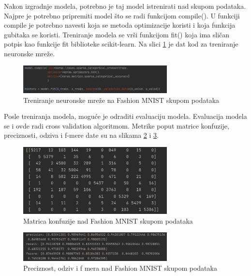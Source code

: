 \documentclass[a4paper,12pt]{report}
\begin{document}
Nakon izgradnje modela, potrebno je taj model istrenirati nad skupom podataka. Najpre je potrebno pripremiti model što se radi funkcijom compile(). U funkciji compile je potrebno navesti koja se metoda optimizacije koristi i koja funkcija gubitaka se koristi. Treniranje modela se vrši funkcijom fit() koja ima sličan potpis kao funkcije fit biblioteke scikit-learn. Na slici \ref{fig:model_compile_fit_NN} je dat kod za treniranje neuronske mreže. 

\begin{figure}[h]
    \centering
    \includegraphics[width=0.7\textwidth]{model_compile_fit_NN.png}
    \caption{Treniranje neuronske mreže na Fashion MNIST skupom podataka}\label{fig:model_compile_fit_NN}
\end{figure}


Posle treniranja modela, moguće je odraditi evaluaciju modela. Evaluacija modela se i ovde radi cross validation algoritmom. Metrike poput matrice konfuzije, preciznosti, odziva i f-mere date su na slikama \ref{fig:softmax_NN_confusion_matrix} i \ref{fig:softmax_NN_metrics}.

\begin{figure}[h]
    \centering
    \includegraphics[width=0.7\textwidth]{softmax_NN_confusion_matrix.png}
    \caption{Matrica konfuzije nad Fashion MNIST skupom podataka }\label{fig:softmax_NN_confusion_matrix}
\end{figure}

\begin{figure}[h]
    \centering
    \includegraphics[width=0.7\textwidth]{softmax_NN_metrics.png}
    \caption{Preciznost, odziv i f mera nad Fashion MNIST skupom podataka}\label{fig:softmax_NN_metrics}
\end{figure}
\end{document}
